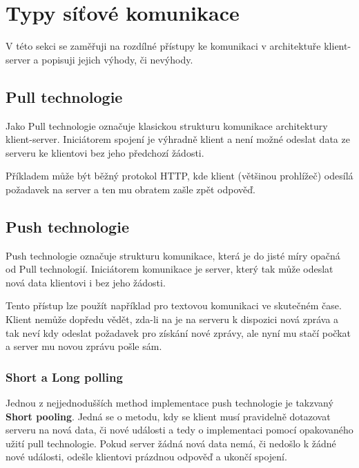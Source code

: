 
\section{Typy síťové komunikace}\label{sec:technologieProKomunikaciSeServerem}

V této sekci se zaměřuji na rozdílné přístupy ke komunikaci v architektuře klient-server a popisuji jejich výhody, či nevýhody.

\subsection{Pull technologie}\label{subsec:pullTechnologie}

Jako Pull technologie označuje klasickou strukturu komunikace architektury klient-server.
Iniciátorem spojení je výhradně klient a není možné odeslat data ze serveru ke klientovi bez jeho předchozí žádosti.

Příkladem může být běžný protokol \gls{HTTP}, kde klient (většinou prohlížeč) odesílá požadavek na server a ten mu obratem zašle zpět odpověď.~\cite{pushpull:about}

\subsection{Push technologie}\label{subsec:pushTechnologie}

Push technologie označuje strukturu komunikace, která je do jisté míry opačná od Pull technologií.
Iniciátorem komunikace je server, který tak může odeslat nová data klientovi i bez jeho žádosti.

Tento přístup lze použít například pro textovou komunikaci ve skutečném čase.
Klient nemůže dopředu vědět, zda-li na je na serveru k dispozici nová zpráva a tak neví kdy odeslat požadavek pro získání nové zprávy, ale nyní mu stačí počkat a server mu novou zprávu pošle sám.~\cite{pushpull:about}

\subsubsection{Short a Long polling}

Jednou z nejjednodušších method implementace push technologie je takzvaný \textbf{Short pooling}.
Jedná se o metodu, kdy se klient musí pravidelně dotazovat serveru na nová data, či nové události a tedy o implementaci pomocí opakovaného užití pull technologie.
Pokud server žádná nová data nemá, či nedošlo k žádné nové události, odešle klientovi prázdnou odpověď a ukončí spojení.

